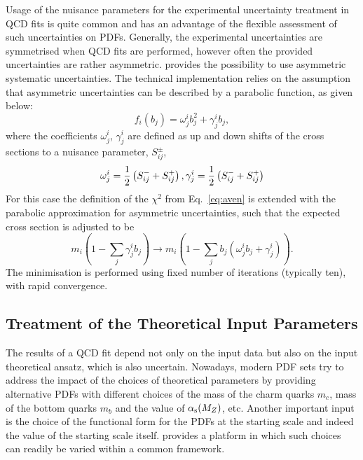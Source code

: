 Usage of the nuisance parameters for the experimental uncertainty treatment in QCD fits is quite 
common and has an advantage of the flexible assessment of such uncertainties on PDFs. 
Generally, the experimental uncertainties are symmetrised when QCD fits 
are performed, however often the provided uncertainties are rather asymmetric.
\fitter provides the possibility to use asymmetric systematic uncertainties.
The technical implementation relies on the assumption that 
asymmetric uncertainties can be described by a parabolic function, as given below:
\begin{equation}
  f_i(b_j)=\omega^i_{j}b_j^2 + \gamma^i_{j}b_j,
\end{equation}
where the coefficients $\omega^i_{j}$, $\gamma^i_{j}$ are defined as 
up and down shifts of the cross sections to a nuisance parameter, $S_{ij}^{\pm}$, 
\begin{equation}
  \omega^i_{j}=\frac{1}{2}\left(S_{ij}^{-}+S_{ij}^{+}\right), \\
  \gamma^i_{j}=\frac{1}{2}\left(S_{ij}^{-}+S_{ij}^{+}\right) 
\end{equation}
For this case the definition of the $\chi^2$ from Eq.~\ref{eq:aven} is extended with the parabolic approximation 
for asymmetric uncertainties, such that the expected cross section is adjusted to be
\begin{equation}
  m_i(1-\sum_j \gamma^i_{j} b_j) \to 
m_i\left(1-\sum_j b_j(\omega^i_{j}b_j + \gamma^i_{j})\right).
\end{equation}
The minimisation is performed using fixed number of iterations (typically ten), with rapid convergence.





\subsection{Treatment of the Theoretical Input Parameters}

The results of a QCD fit depend not only on the input data but also on the 
input theoretical ansatz, which is also uncertain. Nowadays, modern PDF sets 
try to address the impact of the choices of theoretical parameters by providing
alternative PDFs with different choices of the mass of the charm quarks $m_c$, mass of the bottom quarks $m_b$ and the value of $\alpha_\mathrm{s}(M_Z)$, etc. 
Another important input is the choice of the functional form for the PDFs at the starting scale and indeed the value of the starting scale itself. \fitter provides a platform in which such choices can readily be varied within a common framework.


